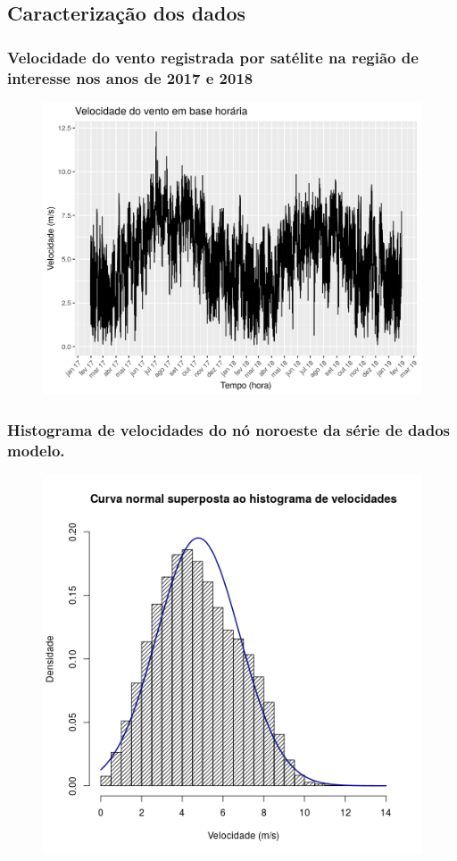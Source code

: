 \documentclass[mathserif,serif]{beamer}
\begin{document}
\subsection{Caracterização dos dados}

\begin{frame}
	\frametitle{Velocidade do vento registrada por satélite na região de interesse nos anos de 2017 e 2018}
	\begin{figure}
		\centering
		\includegraphics[scale=0.55]{entire_series_hourly_basis.png}
	\end{figure}
\end{frame}

\begin{frame}
	\frametitle{Histograma de velocidades do nó noroeste da série de dados modelo.}
	\begin{figure}
		\centering
		\includegraphics[scale=0.43]{normal_overlay}
	\end{figure}
\end{frame}
\end{document}
